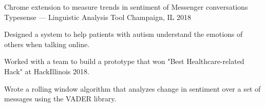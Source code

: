 \begin{cventries}
\cventry
{Chrome extension to measure trends in sentiment of Messenger conversations} %
{Typesense — Linguistic Analysis Tool} %
{Champaign, IL} %
{2018} %
{
	\begin{cvitems} %
		\item {Designed a system to help patients with autism understand the emotions of others when talking online.}
		\item {Worked with a team to build a prototype that won "Best Healthcare-related Hack" at HackIllinois 2018.}
		\item {Wrote a rolling window algorithm that analyzes change in sentiment over a set of messages using the VADER library.}
	\end{cvitems}
}


\end{cventries}
